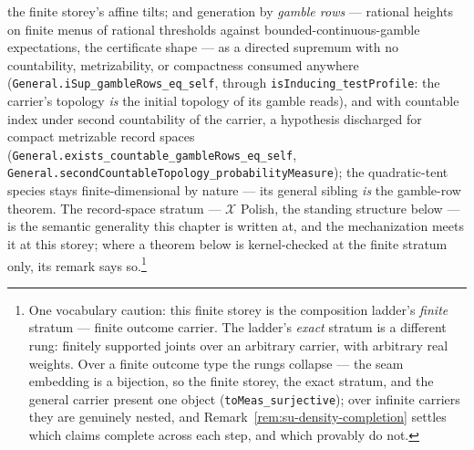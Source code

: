 \begin{remark}
the finite storey's affine tilts; and generation by \emph{gamble
rows} --- rational heights on finite menus of rational thresholds
against bounded-continuous-gamble expectations, the certificate
shape --- as a directed supremum with no countability,
metrizability, or compactness consumed anywhere
(\texttt{General.iSup\_gambleRows\_eq\_self}, through
\texttt{isInducing\_testProfile}: the carrier's topology \emph{is}
the initial topology of its gamble reads), and with countable index
under second countability of the carrier, a hypothesis discharged
for compact metrizable record spaces
(\texttt{General.exists\_countable\_gambleRows\_eq\_self},
\texttt{General.secondCountableTopology\_probabilityMeasure}); the
quadratic-tent species stays finite-dimensional by nature --- its
general sibling \emph{is} the gamble-row theorem. The record-space
stratum --- $\mathcal{X}$ Polish, the standing
structure below --- is the semantic generality this chapter is
written at, and the mechanization meets it at this storey; where a
theorem below is kernel-checked at the finite stratum only, its
remark says so.\footnote{One vocabulary caution: this
finite storey is the composition ladder's \emph{finite} stratum ---
finite outcome carrier.  The ladder's \emph{exact} stratum is a
different rung: finitely supported joints over an arbitrary
carrier, with arbitrary real weights.  Over a finite outcome type
the rungs collapse --- the seam embedding is a bijection, so the
finite storey, the exact stratum, and the general carrier present
one object (\texttt{toMeas\_surjective}); over infinite carriers
they are genuinely nested, and
Remark~\ref{rem:su-density-completion} settles which claims
complete across each step, and which provably do not.}
\end{remark}

